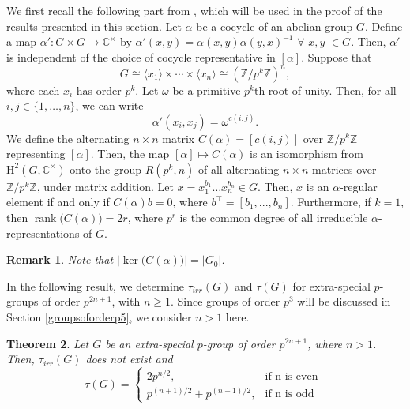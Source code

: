 \documentclass[a4paper,11pt]{amsart}
\numberwithin{equation}{section}
\numberwithin{equation}{subsection}
\newtheorem{theorem}{Theorem}[section]
\newtheorem{remark}[theorem]{Remark}
\newcommand{\Z}{\mathbb{Z}}
\newcommand{\Nayak}[1]{{\color{red} #1}}
\newcommand{\poonam}[1]{{\color{blue} #1}}
\begin{document}

We first recall the following part from \cite[Page 772]{HIGGS}, which will be used in the proof of the results presented in this section. 
Let $\alpha$ be a cocycle of an abelian group $G$. Define a map $\alpha' \colon G \times G \to \mathbb{C}^{\times}$ by $\alpha'(x,y) ={\alpha(x,y)}{\alpha(y,x)^{-1}}$ $\forall$ $x,y$ $\in G$. Then, $\alpha'$ is independent of the choice of cocycle representative in $[\alpha]$. Suppose that
$$G \cong \langle x_1 \rangle \times \cdots \times \langle x_n \rangle \cong (\Z/p^k\Z)^n,$$ where each $x_i$ has order $p^k$. Let $\omega$ be a primitive $p^k$th root of unity. Then, for all $i,j \in \{1,\ldots,n\}$, we can write
\[
\alpha'(x_i,x_j)=\omega^{c(i,j)}.
\]
We define the alternating $n \times n$ matrix $C(\alpha)= [c(i,j)]$ over $\Z/p^k\Z$ representing $[\alpha]$. Then, the map $[\alpha] \mapsto C(\alpha)$ is an isomorphism from $\mathrm{H^2}(G, \mathbb{C}^{\times})$ onto the group $R(p^k,n)$ of all alternating $n \times n$ matrices over $\Z/p^k\Z$, under matrix addition.
Let $x= x_1^{b_1}\dots x_n^{b_n}\in G$. Then, $x$ is an $\alpha$-regular element if and only if $C(\alpha)b= 0$, where $b^{\top}= [b_1,...,b_n]$.
Furthermore, if $k=1$, then $\operatorname{rank}\big(C(\alpha)\big) = 2r$,
where $p^r$ is the common degree of all irreducible $\alpha$-representations of $G$. 

\begin{remark} \label{ker(C(alpha))} Note that $|\operatorname{ker}\big(C(\alpha)\big)| = |G_0|$.   
\end{remark}

In the following result, we determine $\tau_{irr}(G)$ and $\tau(G)$ for extra-special $p$-groups of order $p^{2n+1}$, with $n \geq 1$.
Since groups of order $p^3$ will be discussed in Section \ref{groupsoforderp5}, we consider $n> 1$ here.

\begin{theorem} \label{extraspecial $p$-group}
	Let $G$ be an extra-special $p$-group of order $p^{2n+1}$, where $n>1$. Then, $\tau_{irr}(G)$ does not exist and  
	\begin{equation}\nonumber
		\tau(G) =
		\begin{cases}
			2p^{n/2}, & \text{if n is even }  \\
			p^{(n+1)/2}+p^{(n-1)/2},  & \text{if n is odd } 
		\end{cases}
	\end{equation}
\end{theorem}
\end{document}
